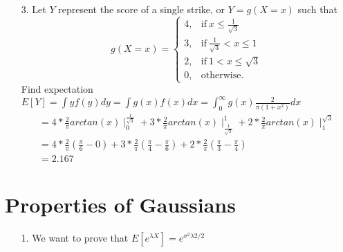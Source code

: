 \documentclass[10pt,a4paper]{article}
\begin{document}
\begin{itemize}
  \item[3.] Let $Y$ represent the score of a single strike, or $Y = g(X=x)$ such that
  \begin{equation*}
    g(X=x) = \begin{cases}
            4, & \text{if}~ x\leq \frac{1}{\sqrt{3}} \\
            3, & \text{if}~ \frac{1}{\sqrt{3}} < x \leq 1 \\
            2, & \text{if}~ 1 < x \leq \sqrt{3} \\
            0, & \text{otherwise.}
           \end{cases}
  \end{equation*}
  Find expectation $E[Y] = \int yf(y)dy = \int g(x)f(x)dx = \int_{0}^{\infty}g(x)\frac{2}{\pi (1+x^2)}dx$
  \begin{align*}
    &=4 * \frac{2}{\pi}arctan(x) \mid_{0}^{\frac{1}{\sqrt{3}}} + 3 * \frac{2}{\pi}arctan(x) \mid_{\frac{1}{\sqrt{3}}}^{1} + 2 * \frac{2}{\pi}arctan(x) \mid_{1}^{\sqrt{3}}& \\
    &=4*\frac{2}{\pi}(\frac{\pi}{6} - 0) + 3*\frac{2}{\pi}(\frac{\pi}{4}-\frac{\pi}{6}) + 2*\frac{2}{\pi}(\frac{\pi}{3} - \frac{\pi}{4})& \\
    &= 2.167&
  \end{align*}
\end{itemize}
\pagebreak

\section{Properties of Gaussians}
\begin{itemize}
  \item[1.] We want to prove that $E[e^{\lambda X}] = e^{\sigma^{2}\lambda{2}/2}$
\end{itemize}
\end{document}
